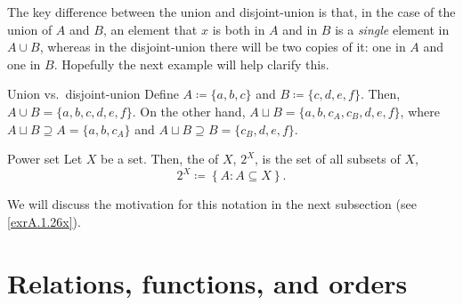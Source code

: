 The key difference between the union and disjoint-union is that, in the case of the union of $A$ and $B$, an element that $x$ is both in $A$ and in $B$ is a \emph{single} element in $A\cup B$, whereas in the disjoint-union there will be two copies of it:  one in $A$ and one in $B$.  Hopefully the next example will help clarify this.
\begin{exm}{Union vs.~disjoint-union}{}
Define $A\coloneqq \{ a,b,c\}$ and $B\coloneqq \{ c,d,e,f\}$.  Then, $A\cup B=\{ a,b,c,d,e,f\}$.  On the other hand, $A\sqcup B=\{ a,b,c_A,c_B,d,e,f\}$, where $A\sqcup B\supseteq A=\{ a,b,c_A\}$ and $A\sqcup B\supseteq B=\{ c_B,d,e,f\}$.
\end{exm}
\begin{dfn}{Power set}{}
Let $X$ be a set.  Then, the  of $X$, $2^X$, is the set of all subsets of $X$,
\begin{equation}
2^X\coloneqq \left\{ A:A\subseteq X\right\} .
\end{equation}
\begin{rmk}
We will discuss the motivation for this notation in the next subsection (see \cref{exrA.1.26x}).
\end{rmk}
\end{dfn}

\section{Relations, functions, and orders}

